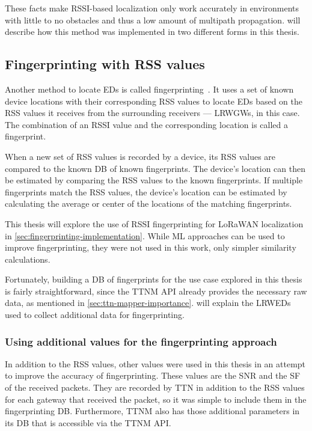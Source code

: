 These facts make \ac{RSSI}-based localization only work accurately in environments with little to no obstacles and thus a low amount of multipath propagation.
 will describe how this method was implemented in two different forms in this thesis.

\subsection{Fingerprinting with \acl{RSS} values}\label{sec:rssi-fingerprinting}

Another method to locate \aclp{ED} is called fingerprinting~\cite{xia_indoor_2017}.
It uses a set of known device locations with their corresponding \ac{RSS} values to locate \aclp{ED} based on the \ac{RSS} values it receives from the surrounding receivers --- \aclp{LRWGW}, in this case.
The combination of an \ac{RSSI} value and the corresponding location is called a fingerprint.

When a new set of \ac{RSS} values is recorded by a device, its \ac{RSS} values are compared to the known \ac{DB} of known fingerprints.
The device's location can then be estimated by comparing the \ac{RSS} values to the known fingerprints.
If multiple fingerprints match the \ac{RSS} values, the device's location can be estimated by calculating the average or center of the locations of the matching fingerprints.

This thesis will explore the use of \ac{RSSI} fingerprinting for \ac{LoRaWAN} localization in \cref{sec:fingerprinting-implementation}.
While \ac{ML} approaches can be used to improve fingerprinting, they were not used in this work, only simpler similarity calculations.

Fortunately, building a \ac{DB} of fingerprints for the use case explored in this thesis is fairly straightforward, since the \ac{TTNM} \ac{API} already provides the necessary raw data, as mentioned in \cref{sec:ttn-mapper-importance}.
 will explain the \aclp{LRWED} used to collect additional data for fingerprinting.

\subsubsection{Using additional values for the fingerprinting approach}\label{sec:fingerprinting-additional-values}

In addition to the \ac{RSS} values, other values were used in this thesis in an attempt to improve the accuracy of fingerprinting.
These values are the \ac{SNR} and the \ac{SF} of the received packets.
They are recorded by \ac{TTN} in addition to the \ac{RSS} values for each gateway that received the packet, so it was simple to include them in the fingerprinting \ac{DB}.
Furthermore, \ac{TTNM} also has those additional parameters in its \ac{DB} that is accessible via the \ac{TTNM} \ac{API}.